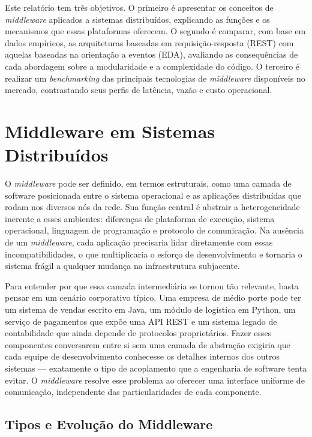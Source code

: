 \documentclass[12pt, a4paper]{article}
\begin{document}
Este relatório tem três objetivos. O primeiro é apresentar os conceitos de \textit{middleware} aplicados a sistemas distribuídos, explicando as funções e os mecanismos que essas plataformas oferecem. O segundo é comparar, com base em dados empíricos, as arquiteturas baseadas em requisição-resposta (REST) com aquelas baseadas na orientação a eventos (EDA), avaliando as consequências de cada abordagem sobre a modularidade e a complexidade do código. O terceiro é realizar um \textit{benchmarking} das principais tecnologias de \textit{middleware} disponíveis no mercado, contrastando seus perfis de latência, vazão e custo operacional.


\section{Middleware em Sistemas Distribuídos}

O \textit{middleware} pode ser definido, em termos estruturais, como uma camada de software posicionada entre o sistema operacional e as aplicações distribuídas que rodam nos diversos nós da rede. Sua função central é abstrair a heterogeneidade inerente a esses ambientes: diferenças de plataforma de execução, sistema operacional, linguagem de programação e protocolo de comunicação. Na ausência de um \textit{middleware}, cada aplicação precisaria lidar diretamente com essas incompatibilidades, o que multiplicaria o esforço de desenvolvimento e tornaria o sistema frágil a qualquer mudança na infraestrutura subjacente.

Para entender por que essa camada intermediária se tornou tão relevante, basta pensar em um cenário corporativo típico. Uma empresa de médio porte pode ter um sistema de vendas escrito em Java, um módulo de logística em Python, um serviço de pagamentos que expõe uma API REST e um sistema legado de contabilidade que ainda depende de protocolos proprietários. Fazer esses componentes conversarem entre si sem uma camada de abstração exigiria que cada equipe de desenvolvimento conhecesse os detalhes internos dos outros sistemas --- exatamente o tipo de acoplamento que a engenharia de software tenta evitar. O \textit{middleware} resolve esse problema ao oferecer uma interface uniforme de comunicação, independente das particularidades de cada componente.


\subsection{Tipos e Evolução do Middleware}
\end{document}
